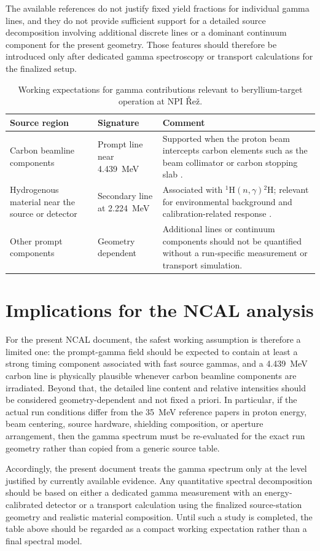 The available references do not justify fixed yield fractions for individual gamma lines, and they do not provide sufficient support for a detailed source decomposition involving additional discrete lines or a dominant continuum component for the present geometry. Those features should therefore be introduced only after dedicated gamma spectroscopy or transport calculations for the finalized setup.

\begin{table}[htbp]
\centering
\caption{Working expectations for gamma contributions relevant to beryllium-target operation at NPI \v{R}e\v{z}.}
\begin{tabular}{p{3.3cm}p{3.3cm}p{6.0cm}}
\toprule
Source region & Signature & Comment \\
\midrule
Carbon beamline components & Prompt line near \SI{4.439}{MeV} & Supported when the proton beam intercepts carbon elements such as the beam collimator or carbon stopping slab \citep{Ansorge2025CollimatedBeams,Majerle2023PBeGenerator}. \\
Hydrogenous material near the source or detector & Secondary line at \SI{2.224}{MeV} & Associated with \(^{1}\mathrm{H}(n,\gamma){}^{2}\mathrm{H}\); relevant for environmental background and calibration-related response \citep{Ansorge2025CollimatedBeams}. \\
Other prompt components & Geometry dependent & Additional lines or continuum components should not be quantified without a run-specific measurement or transport simulation. \\
\bottomrule
\end{tabular}
\end{table}

\section{Implications for the NCAL analysis}

For the present NCAL document, the safest working assumption is therefore a limited one: the prompt-gamma field should be expected to contain at least a strong timing component associated with fast source gammas, and a \SI{4.439}{MeV} carbon line is physically plausible whenever carbon beamline components are irradiated. Beyond that, the detailed line content and relative intensities should be considered geometry-dependent and not fixed a priori. In particular, if the actual run conditions differ from the \SI{35}{MeV} reference papers in proton energy, beam centering, source hardware, shielding composition, or aperture arrangement, then the gamma spectrum must be re-evaluated for the exact run geometry rather than copied from a generic source table.

Accordingly, the present document treats the gamma spectrum only at the level justified by currently available evidence. Any quantitative spectral decomposition should be based on either a dedicated gamma measurement with an energy-calibrated detector or a transport calculation using the finalized source-station geometry and realistic material composition. Until such a study is completed, the table above should be regarded as a compact working expectation rather than a final spectral model.
